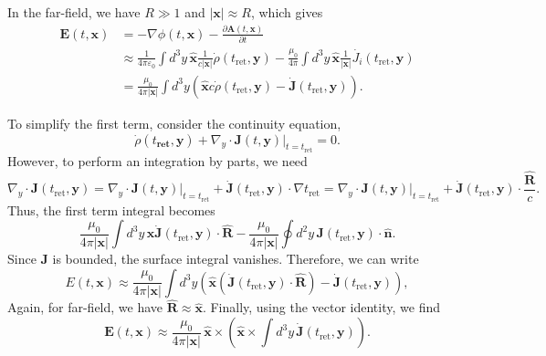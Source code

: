 In the far-field, we have $R\gg 1$ and $|\mathbf{x}|\approx R$, which gives
\begin{align}
    \mathbf{E}(t,\mathbf{x}) &= -\nabla\phi(t,\mathbf{x})-\frac{\partial\mathbf{A}(t,\mathbf{x})}{\partial t}\\
    &\approx\frac{1}{4\pi\varepsilon_0}\int d^3y\,\hat{\mathbf{x}}
  \frac{1}{c|\mathbf{x}|}\dot{\rho}(t_{\mathrm{ret}},\mathbf{y}) - \frac{\mu_0}{4\pi}\int d^3y\,\hat{\mathbf{x}}
  \frac{1}{|\mathbf{x}|}\dot{J_i}(t_{\mathrm{ret}},\mathbf{y})\\
  &=\frac{\mu_0}{4\pi|\mathbf{x}|}\int d^3y
    \left(\hat{\mathbf{x}}c\dot{\rho}(t_{\mathrm{ret}},\mathbf{y})
    - \dot{\mathbf{J}}(t_{\mathrm{ret}},\mathbf{y})\right).
\end{align}

To simplify the first term, consider the continuity equation,
\begin{equation}
    \dot{\rho}(t_\textbf{ret},\mathbf{y}) + \nabla_y\cdot \mathbf{J}(t,\mathbf{y})\bigg|_{t=t_\text{ret}}=0.
\end{equation}
However, to perform an integration by parts, we need
\begin{equation}
    \nabla_y\cdot\mathbf{J}(t_\text{ret},\mathbf{y}) = \nabla_y\cdot \mathbf{J}(t,\mathbf{y})\bigg|_{t=t_\text{ret}} + \dot{\mathbf{J}}(t_\text{ret},\mathbf{y})\cdot\nabla t_\text{ret} = \nabla_y\cdot \mathbf{J}(t,\mathbf{y})\bigg|_{t=t_\text{ret}} + \dot{\mathbf{J}}(t_\text{ret},\mathbf{y})\cdot\frac{\hat{\mathbf{R}}}{c}.
\end{equation}
Thus, the first term integral becomes
\begin{equation}
    \frac{\mu_0}{4\pi|\mathbf{x}|}\int d^3y\,
    \hat{\mathbf{x}}\dot{\mathbf{J}}(t_\text{ret},\mathbf{y})\cdot\hat{\mathbf{R}} - \frac{\mu_0}{4\pi|\mathbf{x}|}\oint d^2y\,\mathbf{J}(t_\text{ret},\mathbf{y})\cdot \hat{\mathbf{n}}.
\end{equation}
Since $\mathbf{J}$ is bounded, the surface integral vanishes. Therefore, we can write
\begin{equation}
    E(t, \mathbf{x}) \approx \frac{\mu_0}{4\pi|\mathbf{x}|}\int d^3y \left(\hat{\mathbf{x}}(\dot{\mathbf{J}}(t_\text{ret},\mathbf{y})\cdot\hat{\mathbf{R}}) - \dot{\mathbf{J}}(t_\text{ret},\mathbf{y})\right),
\end{equation}
Again, for far-field, we have $\hat{\mathbf{R}} \approx \hat{\mathbf{x}}$. Finally, using the vector identity, we find
\begin{equation}
    \mathbf{E}(t,\mathbf{x})
  \approx \frac{\mu_0}{4\pi|\mathbf{x}|}\,\hat{\mathbf{x}}\times
    \left(\hat{\mathbf{x}}\times\int d^3y\,
    \dot{\mathbf{J}}(t_{\mathrm{ret}},\mathbf{y})\right).
\end{equation}

